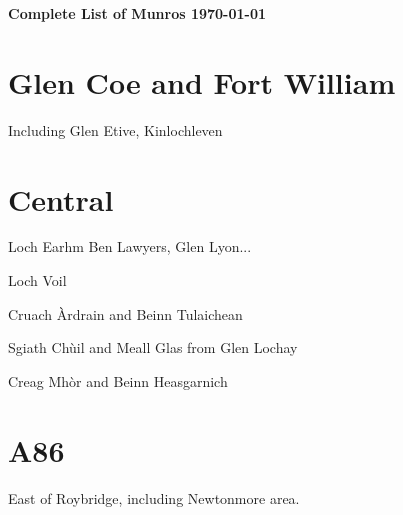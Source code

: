 \documentclass[12pt,a4paper]{article}
\begin{document}
\begin{center}
\Large\bf Complete List of  Munros
\large \today
\end{center}



 

\section{Glen Coe and Fort William}

Including Glen Etive, Kinlochleven

\section{Central}

Loch Earhm Ben Lawyers, Glen Lyon...

Loch Voil

Cruach Àrdrain and Beinn Tulaichean

Sgiath Chùil and Meall Glas from Glen Lochay



Creag Mhòr and Beinn Heasgarnich

\section{A86}

East of Roybridge, including Newtonmore area. 
\end{document}
